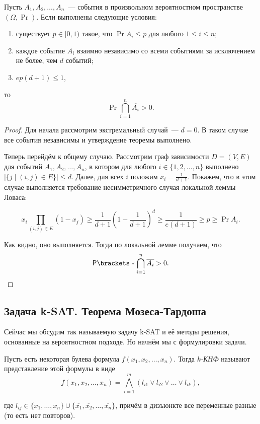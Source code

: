 \begin{theorem}
    Пусть \(A_1, A_2, \dots, A_n\)~--- события в произвольном вероятностном пространстве \((\Omega, \Pr)\). Если выполнены следующие условия:
    \begin{enumerate}
        \item существует \(p \in [0, 1)\) такое, что \(\Pr{A_i} \leq p\) для любого \(1 \leq i \leq n\);
        \item каждое событие \(A_i\) взаимно независимо со всеми событиями за исключением не более, чем \(d\) событий;
        \item \(ep(d + 1) \leq 1\),
    \end{enumerate}
    то \[\Pr{\bigcap\limits_{i = 1}^{n}\overline{A_i}} > 0.\]
\end{theorem}
\begin{proof}
    Для начала рассмотрим экстремальный случай~--- \(d = 0\). В таком случае все события независимы и утверждение теоремы выполнено.
    
    Теперь перейдём к общему случаю. Рассмотрим граф зависимости \(D = (V, E)\) для событий \(A_1, A_2, \dots, A_n\), в котором для любого \(i \in \{1, 2, \dots, n\}\) выполнено \(\left|\{j \mid (i, j) \in E\}\right| \leq d\). Далее, для всех \(i\) положим \(x_i = \frac{1}{d + 1}\). Покажем, что в этом случае выполняется требование несимметричного случая локальной леммы Ловаса:
    
    \[x_i\prod\limits_{(i, j) \in E} (1 - x_j) \geq \frac{1}{d + 1}\left(1 - \frac{1}{d + 1}\right)^{d} \geq \frac{1}{e(d + 1)} \geq p \geq \Pr{A_i}.\]
    
    Как видно, оно выполняется. Тогда по локальной лемме получаем, что
    \[\Pr{\bigcap\limits_{i = 1}^{n}\overline{A_i}} > 0. \qedhere\]
\end{proof}

\subsection{Задача \textsf{k-SAT}. Теорема Мозеса-Тардоша}
Сейчас мы обсудим так называемую задачу \textsf{k-SAT} и её методы решения, основанные на вероятностном подходе. Но начнём мы с формулировки задачи.

\begin{definition}
    Пусть есть некоторая булева формула \(f(x_1, x_2, \dots, x_n)\). Тогда \emph{\(k\)-КНФ} называют представление этой формулы в виде
    \[f(x_1, x_2, \dots, x_n) = \bigwedge\limits_{i = 1}^{m} \left(l_{i1} \lor l_{i2} \lor \dots \lor l_{ik}\right),\]
    
    где \(l_{ij} \in \{x_1, \dots, x_n\} \cup \{\overline{x_1}, \overline{x_2}, \dots, \overline{x_n}\}\), причём в дизъюнкте все переменные разные (то есть нет повторов).
\end{definition}

